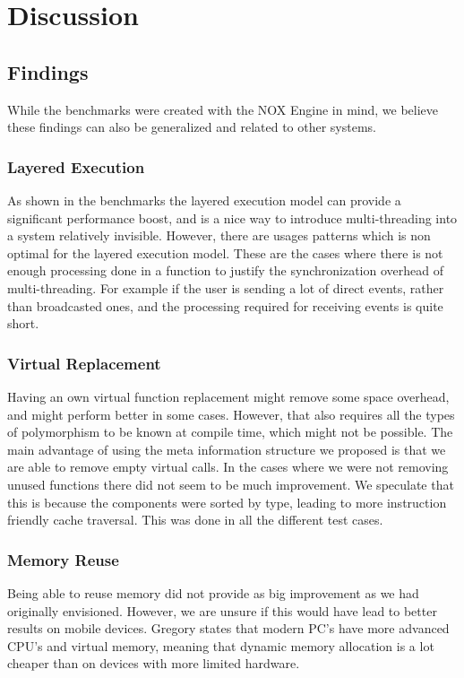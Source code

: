 \chapter{Discussion}
\label{chap:discussion}

\section{Findings}
While the benchmarks were created with the NOX Engine in mind,
we believe these findings can also be generalized and related to other systems.

\subsection{Layered Execution}
As shown in the benchmarks the layered execution model can provide a significant performance boost,
and is a nice way to introduce multi-threading into a system relatively invisible.
However, there are usages patterns which is non optimal for the layered execution model.
These are the cases where there is not enough processing done in a function to justify the synchronization overhead
of multi-threading.
For example if the user is sending a lot of direct events, rather than broadcasted ones,
and the processing required for receiving events is quite short.

\subsection{Virtual Replacement}
Having an own virtual function replacement might remove some space overhead, and might perform better in some cases.
However, that also requires all the types of polymorphism to be known at compile time, which might
not be possible.
The main advantage of using the meta information structure we proposed is that we are able to remove empty
virtual calls.
In the cases where we were not removing unused functions there did not seem to be much improvement.
We speculate that this is because the components were sorted by type, leading to more instruction friendly
cache traversal. This was done in all the different test cases.

\subsection{Memory Reuse}
Being able to reuse memory did not provide as big improvement as we had originally envisioned.
However, we are unsure if this would have lead to better results on mobile devices.
Gregory\cite[p.262]{game_engine_architecture} states that modern PC's have more advanced CPU's and virtual
memory, meaning that dynamic memory allocation is a lot cheaper than on devices with more limited hardware.

